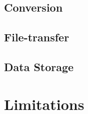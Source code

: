 \subsection{Conversion}

\FloatBarrier


\subsection{File-transfer}

\FloatBarrier

\subsection{Data Storage}

\FloatBarrier

\section{Limitations}

